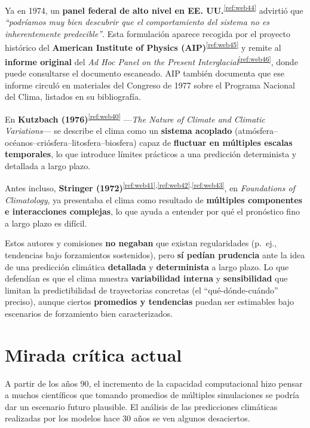 \documentclass[
  10pt,
  a4paper,
  DIV=11,
  numbers=noendperiod,
  open=any]{scrreprt}
\numberwithin{equation}{chapter}
\numberwithin{equation}{section}
\renewcommand{\[}{\begin{equation}}
\renewcommand{\]}{\end{equation}}
\begin{document}
Ya en 1974, un \textbf{panel federal de alto nivel en EE. UU.}\textsuperscript{\ref{ref:web44}} advirtió que \emph{“podríamos muy bien descubrir que el comportamiento del sistema no es inherentemente predecible”}. Esta formulación aparece recogida por el proyecto histórico del \textbf{American Institute of Physics (AIP)}\textsuperscript{\ref{ref:web45}} y remite al \textbf{informe original} del \emph{Ad Hoc Panel on the Present Interglacial}\textsuperscript{\ref{ref:web46}}, donde puede consultarse el documento escaneado. AIP también documenta que ese informe circuló en materiales del Congreso de 1977 sobre el Programa Nacional del Clima, listados en su bibliografía.

En \textbf{Kutzbach (1976)}\textsuperscript{\ref{ref:web40}} —\emph{The Nature of Climate and Climatic Variations}— se describe el clima como un \textbf{sistema acoplado} (atmósfera–océanos–criósfera–litosfera–biosfera) capaz de \textbf{fluctuar en múltiples escalas temporales}, lo que introduce límites prácticos a una predicción determinista y detallada a largo plazo.  

Antes incluso, \textbf{Stringer (1972)}\textsuperscript{\ref{ref:web41},\ref{ref:web42},\ref{ref:web43}}, en \emph{Foundations of Climatology}, ya presentaba el clima como resultado de \textbf{múltiples componentes e interacciones complejas}, lo que ayuda a entender por qué el pronóstico fino a largo plazo es difícil.


Estos autores y comisiones \textbf{no negaban} que existan regularidades
(p.~ej., tendencias bajo forzamientos sostenidos), pero \textbf{sí
pedían prudencia} ante la idea de una predicción climática
\textbf{detallada} y \textbf{determinista} a largo plazo. Lo que
defendían es que el clima muestra \textbf{variabilidad interna} y
\textbf{sensibilidad} que limitan la predictibilidad de trayectorias
concretas (el ``qué-dónde-cuándo'' preciso), aunque ciertos
\textbf{promedios y tendencias} puedan ser estimables bajo escenarios de
forzamiento bien caracterizados.

\section{Mirada crítica actual}\label{mirada-cruxedtica-actual}

A partir de los años 90, el incremento de la capacidad computacional
hizo pensar a muchos científicos que tomando promedios de múltiples
simulaciones se podría dar un escenario futuro plausible. El análisis de las predicciones climáticas realizadas por los modelos hace 30 años se ven algunos desaciertos. 
\end{document}
